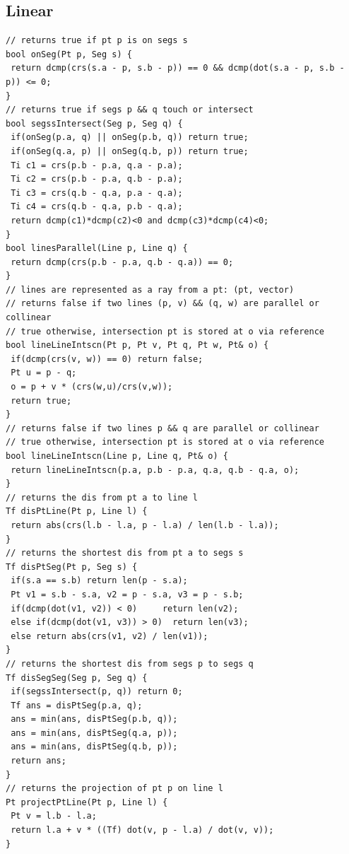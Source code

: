 \documentclass[a4paper,11pt,oneside]{article}
\begin{document}
\begin{multicols*}{\COLS}
\subsection{Linear}
\begin{lstlisting}
// returns true if pt p is on segs s
bool onSeg(Pt p, Seg s) {
 return dcmp(crs(s.a - p, s.b - p)) == 0 && dcmp(dot(s.a - p, s.b - p)) <= 0;
}
// returns true if segs p && q touch or intersect
bool segssIntersect(Seg p, Seg q) {
 if(onSeg(p.a, q) || onSeg(p.b, q)) return true;
 if(onSeg(q.a, p) || onSeg(q.b, p)) return true;
 Ti c1 = crs(p.b - p.a, q.a - p.a);
 Ti c2 = crs(p.b - p.a, q.b - p.a);
 Ti c3 = crs(q.b - q.a, p.a - q.a);
 Ti c4 = crs(q.b - q.a, p.b - q.a);
 return dcmp(c1)*dcmp(c2)<0 and dcmp(c3)*dcmp(c4)<0;
}
bool linesParallel(Line p, Line q) {
 return dcmp(crs(p.b - p.a, q.b - q.a)) == 0;
}
// lines are represented as a ray from a pt: (pt, vector)
// returns false if two lines (p, v) && (q, w) are parallel or collinear
// true otherwise, intersection pt is stored at o via reference
bool lineLineIntscn(Pt p, Pt v, Pt q, Pt w, Pt& o) {
 if(dcmp(crs(v, w)) == 0) return false;
 Pt u = p - q;
 o = p + v * (crs(w,u)/crs(v,w));
 return true;
}
// returns false if two lines p && q are parallel or collinear
// true otherwise, intersection pt is stored at o via reference
bool lineLineIntscn(Line p, Line q, Pt& o) {
 return lineLineIntscn(p.a, p.b - p.a, q.a, q.b - q.a, o);
}
// returns the dis from pt a to line l
Tf disPtLine(Pt p, Line l) {
 return abs(crs(l.b - l.a, p - l.a) / len(l.b - l.a));
}
// returns the shortest dis from pt a to segs s
Tf disPtSeg(Pt p, Seg s) {
 if(s.a == s.b) return len(p - s.a);
 Pt v1 = s.b - s.a, v2 = p - s.a, v3 = p - s.b;
 if(dcmp(dot(v1, v2)) < 0)     return len(v2);
 else if(dcmp(dot(v1, v3)) > 0)  return len(v3);
 else return abs(crs(v1, v2) / len(v1));
}
// returns the shortest dis from segs p to segs q
Tf disSegSeg(Seg p, Seg q) {
 if(segssIntersect(p, q)) return 0;
 Tf ans = disPtSeg(p.a, q);
 ans = min(ans, disPtSeg(p.b, q));
 ans = min(ans, disPtSeg(q.a, p));
 ans = min(ans, disPtSeg(q.b, p));
 return ans;
}
// returns the projection of pt p on line l
Pt projectPtLine(Pt p, Line l) {
 Pt v = l.b - l.a;
 return l.a + v * ((Tf) dot(v, p - l.a) / dot(v, v));
}
\end{lstlisting}

\end{multicols*}
\end{document}
